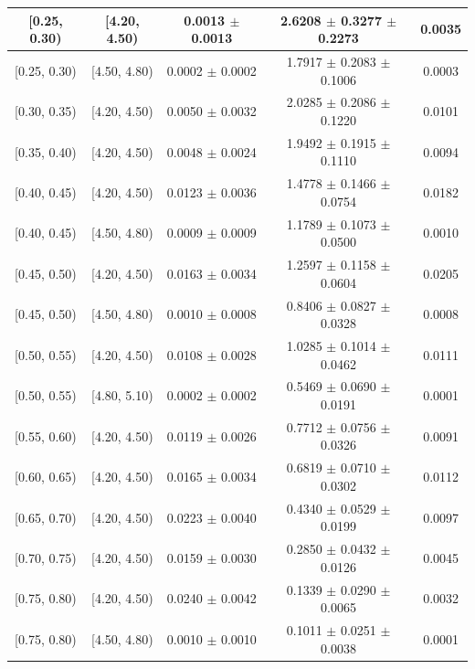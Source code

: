 \begin{longtable}{|c|c|c|c|c|}
\hline
\endlastfoot
[0.25, 0.30) & [4.20, 4.50) & 0.0013 $\pm$ 0.0013 & 2.6208 $\pm$ 0.3277 $\pm$ 0.2273 & 0.0035 \\ 
\hline
[0.25, 0.30) & [4.50, 4.80) & 0.0002 $\pm$ 0.0002 & 1.7917 $\pm$ 0.2083 $\pm$ 0.1006 & 0.0003 \\ 
\hline
[0.30, 0.35) & [4.20, 4.50) & 0.0050 $\pm$ 0.0032 & 2.0285 $\pm$ 0.2086 $\pm$ 0.1220 & 0.0101 \\ 
\hline
[0.35, 0.40) & [4.20, 4.50) & 0.0048 $\pm$ 0.0024 & 1.9492 $\pm$ 0.1915 $\pm$ 0.1110 & 0.0094 \\ 
\hline
[0.40, 0.45) & [4.20, 4.50) & 0.0123 $\pm$ 0.0036 & 1.4778 $\pm$ 0.1466 $\pm$ 0.0754 & 0.0182 \\ 
\hline
[0.40, 0.45) & [4.50, 4.80) & 0.0009 $\pm$ 0.0009 & 1.1789 $\pm$ 0.1073 $\pm$ 0.0500 & 0.0010 \\ 
\hline
[0.45, 0.50) & [4.20, 4.50) & 0.0163 $\pm$ 0.0034 & 1.2597 $\pm$ 0.1158 $\pm$ 0.0604 & 0.0205 \\ 
\hline
[0.45, 0.50) & [4.50, 4.80) & 0.0010 $\pm$ 0.0008 & 0.8406 $\pm$ 0.0827 $\pm$ 0.0328 & 0.0008 \\ 
\hline
[0.50, 0.55) & [4.20, 4.50) & 0.0108 $\pm$ 0.0028 & 1.0285 $\pm$ 0.1014 $\pm$ 0.0462 & 0.0111 \\ 
\hline
[0.50, 0.55) & [4.80, 5.10) & 0.0002 $\pm$ 0.0002 & 0.5469 $\pm$ 0.0690 $\pm$ 0.0191 & 0.0001 \\ 
\hline
[0.55, 0.60) & [4.20, 4.50) & 0.0119 $\pm$ 0.0026 & 0.7712 $\pm$ 0.0756 $\pm$ 0.0326 & 0.0091 \\ 
\hline
[0.60, 0.65) & [4.20, 4.50) & 0.0165 $\pm$ 0.0034 & 0.6819 $\pm$ 0.0710 $\pm$ 0.0302 & 0.0112 \\ 
\hline
[0.65, 0.70) & [4.20, 4.50) & 0.0223 $\pm$ 0.0040 & 0.4340 $\pm$ 0.0529 $\pm$ 0.0199 & 0.0097 \\ 
\hline
[0.70, 0.75) & [4.20, 4.50) & 0.0159 $\pm$ 0.0030 & 0.2850 $\pm$ 0.0432 $\pm$ 0.0126 & 0.0045 \\ 
\hline
[0.75, 0.80) & [4.20, 4.50) & 0.0240 $\pm$ 0.0042 & 0.1339 $\pm$ 0.0290 $\pm$ 0.0065 & 0.0032 \\ 
\hline
[0.75, 0.80) & [4.50, 4.80) & 0.0010 $\pm$ 0.0010 & 0.1011 $\pm$ 0.0251 $\pm$ 0.0038 & 0.0001 \\ 
\hline
\end{longtable}
